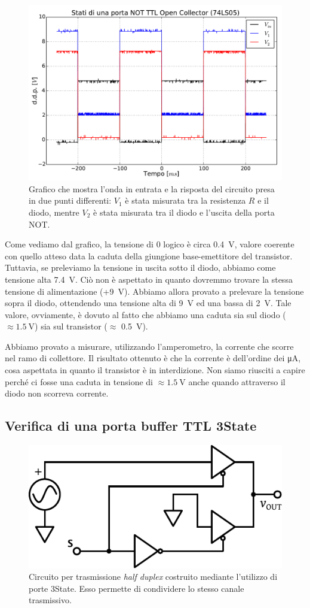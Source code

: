 \begin{figure}[htpc]
\centering
\includegraphics[width=.65\textwidth]{../E10/latex/NOTTTL.pdf}
\caption{Grafico che mostra l'onda in entrata e la risposta del circuito presa in due punti differenti: $V_1$ è stata misurata tra la resistenza $R$ e il diodo, mentre $V_2$ è stata misurata tra il diodo e l'uscita della porta NOT.}
\label{gr10:notttl}
\end{figure}

Come vediamo dal grafico, la tensione di 0 logico è circa \SI{0.4}{\volt}, valore coerente con quello atteso data la caduta della giungione base-emettitore del transistor.
Tuttavia, se preleviamo la tensione in uscita sotto il diodo, abbiamo come tensione alta \SI{7.4}{\V}.
Ciò non è aspettato in quanto dovremmo trovare la stessa tensione di alimentazione (+\SI{9}{\V}).
Abbiamo allora provato a prelevare la tensione sopra il diodo, ottendendo una tensione alta di \SI{9}{\V} ed una bassa di \SI{2}{\V}.
Tale valore, ovviamente, è dovuto al fatto che abbiamo una caduta sia sul diodo ($\approx \SI{1.5}{\V}$) sia sul transistor ($\approx$ \SI{0.5}{\V}).

Abbiamo provato a misurare, utilizzando l'amperometro, la corrente che scorre nel ramo di collettore.
Il risultato ottenuto è che la corrente è dell'ordine dei \si{\micro\ampere}, cosa aspettata  in quanto il transistor è in interdizione.
Non siamo riusciti a capire perché ci fosse una caduta in tensione di $\approx \SI{1.5}{\volt}$ anche quando attraverso il diodo non scorreva corrente.

\newpage
\subsection{Verifica di una porta buffer TTL 3State}

\begin{figure}
\centering
\includegraphics[width=.4\textwidth]{../E10/latex/impedence.pdf}
\caption{Circuito per trasmissione \textit{half duplex} costruito mediante l'utilizzo di porte 3State. Esso permette di condividere lo stesso canale trasmissivo.}
\label{cir10:3state}
\end{figure}

